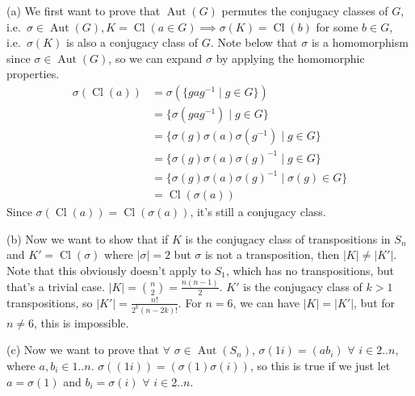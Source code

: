 \documentclass[fleqn]{article}
\DeclareMathOperator{\Cl}{Cl}
\DeclareMathOperator{\Aut}{Aut}
\begin{document}
        (a) We first want to prove that $\Aut(G)$ permutes the conjugacy classes of $G$, i.e.\ $\sigma \in \Aut(G), K = \Cl(a \in G) \implies \sigma(K) = \Cl(b)$ for some $b \in G$, i.e.\ $\sigma(K)$ is also a conjugacy class of $G$.  Note below that $\sigma$ is a homomorphism since $\sigma \in \Aut(G)$, so we can expand $\sigma$ by applying the homomorphic properties.
        \begin{align}
            \sigma(\Cl(a)) &= \sigma(\{gag^{-1} \mid g \in G\}) \\
                &= \{\sigma(gag^{-1}) \mid g \in G\} \\
                &= \{\sigma(g)\sigma(a)\sigma(g^{-1}) \mid g \in G\} \\
                &= \{\sigma(g)\sigma(a)\sigma(g)^{-1} \mid g \in G\} \\
                &= \{\sigma(g)\sigma(a)\sigma(g)^{-1} \mid \sigma(g) \in G\} \\
                &= \Cl(\sigma(a))
        \end{align}
        Since $\sigma(\Cl(a)) = \Cl(\sigma(a))$, it's still a conjugacy class.
        
        (b) Now we want to show that if $K$ is the conjugacy class of transpositions in $S_n$ and $K' = \Cl(\sigma)$ where $|\sigma| = 2$ but $\sigma$ is not a transposition, then $|K| \neq |K'|$.  Note that this obviously doesn't apply to $S_1$, which has no transpositions, but that's a trivial case.  $|K| = \binom{n}{2} = \frac{n(n - 1)}{2}$.  $K'$ is the conjugacy class of $k > 1$ transpositions, so $|K'| = \frac{n!}{2^k(n - 2k)!}$.  For $n = 6$, we can have $|K| = |K'|$, but for $n \neq 6$, this is impossible.
        
        (c) Now we want to prove that $\forall$ $\sigma \in \Aut(S_n)$, $\sigma(1 i) = (a b_i)$ $\forall$ $i \in 2..n$, where $a, b_i \in 1..n$.  $\sigma((1 i)) = (\sigma(1) \sigma(i))$, so this is true if we just let $a = \sigma(1)$ and $b_i = \sigma(i)$ $\forall$ $i \in 2..n$.
        
\end{document}
